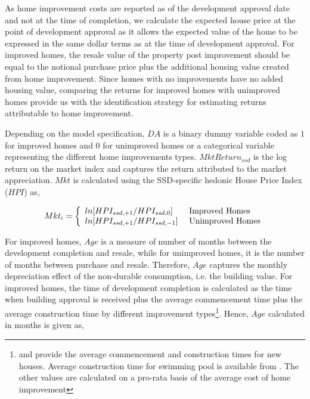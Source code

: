 \documentclass[AEJ,reqno, draftmode]{AEA} %
\begin{document}
As home improvement costs are reported as of the development approval date and not at the time of completion, we calculate the expected house price at the point of development approval as it allows the expected value of the home to be expressed in the same dollar terms as at the time of development approval. For improved homes, the resale value of the property post improvement should be equal to the notional purchase price plus the additional housing value created from home improvement. Since homes with no improvements have no added housing value, comparing the returns for improved homes with unimproved homes provide us with the identification strategy for estimating returns attributable to home improvement. 

Depending on the model specification, $DA$ is a binary dummy variable coded as $1$ for improved homes and $0$ for unimproved homes or a categorical variable representing the different home improvements types. $MktReturn_{ssd}$ is the log return on the market index and captures the return attributed to the market appreciation. $Mkt$ is calculated using the SSD-specific hedonic House Price Index ($HPI$) as,

\begin{equation}
    Mkt_i = \left\{
    \begin{array}{l l}
      ln[HPI_{ssd,+1}/HPI_{ssd,0}] & \text{ Improved Homes}\\
      ln[HPI_{ssd,+1}/HPI_{ssd,-1}] & \text{ Unimproved Homes} \\
    \end{array} \right.
\end{equation}

For improved homes, $Age$ is a measure of number of months between the development completion and resale, while for unimproved homes, it is the number of months between purchase and resale. Therefore, $Age$ captures the monthly depreciation effect of the non-durable consumption, i.e. the building value. For improved homes, the time of development completion is calculated as the time when building approval is received plus the average commencement time plus the average construction time by different improvement types\footnote{\citet{abs_house_times_commence} and \citet{abs_house_times} provide the average commencement and construction times for new houses. Average construction time for swimming pool is available from \citep{hi_swimming_time}. The other values are calculated on a pro-rata basis of the average cost of home improvement}. Hence, $Age$ calculated in months is given as, 
\end{document}
